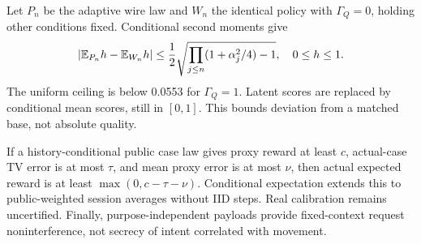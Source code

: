 Let $P_n$ be the adaptive wire law and $W_n$ the identical policy with
$\Gamma_Q=0$, holding other conditions fixed. Conditional second moments give
\begin{equation}
|\mathbb E_{P_n}h-\mathbb E_{W_n}h|
\le\frac12\sqrt{\prod_{j\le n}(1+\alpha_j^2/4)-1},
\quad 0\le h\le1. \label{eq:tv}
\end{equation}
The uniform ceiling is below 0.0553 for $\Gamma_Q=1$.
Latent scores are replaced by conditional mean scores, still in $[0,1]$.
This bounds deviation from a matched base, not absolute quality.

If a history-conditional public case law gives proxy reward at least $c$,
actual-case TV error is at most $\tau$, and mean proxy error is at most $\nu$,
then actual expected reward is at least $\max(0,c-\tau-\nu)$.
Conditional expectation extends this to public-weighted session averages without
IID steps. Real calibration remains uncertified.
Finally, purpose-independent payloads provide fixed-context request
noninterference, not secrecy of intent correlated with movement.

